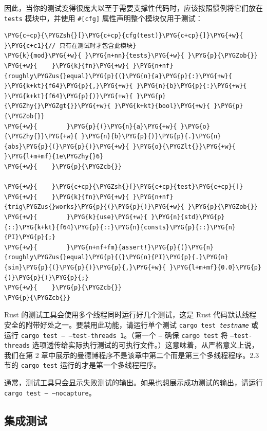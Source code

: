 因此，当你的测试变得很庞大以至于需要支撑性代码时，应该按照惯例将它们放在 \texttt{tests} 模块中，并使用 \texttt{\#[cfg]} 属性声明整个模块仅用于测试：

\begin{Verbatim}[commandchars=\\\{\},breaklines=true,breakanywhere=true,fontsize=\codefont,xleftmargin=17bp]
\PYG{c+cp}{\PYGZsh{}[}\PYG{c+cp}{cfg(test)}\PYG{c+cp}{]}\PYG{+w}{   }\PYG{c+c1}{// 只有在测试时才包含此模块}
\PYG{k}{mod}\PYG{+w}{ }\PYG{n+nn}{tests}\PYG{+w}{ }\PYG{p}{\PYGZob{}}
\PYG{+w}{    }\PYG{k}{fn}\PYG{+w}{ }\PYG{n+nf}{roughly\PYGZus{}equal}\PYG{p}{(}\PYG{n}{a}\PYG{p}{:}\PYG{+w}{ }\PYG{k+kt}{f64}\PYG{p}{,}\PYG{+w}{ }\PYG{n}{b}\PYG{p}{:}\PYG{+w}{ }\PYG{k+kt}{f64}\PYG{p}{)}\PYG{+w}{ }\PYG{p}{\PYGZhy{}\PYGZgt{}}\PYG{+w}{ }\PYG{k+kt}{bool}\PYG{+w}{ }\PYG{p}{\PYGZob{}}
\PYG{+w}{        }\PYG{p}{(}\PYG{n}{a}\PYG{+w}{ }\PYG{o}{\PYGZhy{}}\PYG{+w}{ }\PYG{n}{b}\PYG{p}{)}\PYG{p}{.}\PYG{n}{abs}\PYG{p}{(}\PYG{p}{)}\PYG{+w}{ }\PYG{o}{\PYGZlt{}}\PYG{+w}{ }\PYG{l+m+mf}{1e\PYGZhy{}6}
\PYG{+w}{    }\PYG{p}{\PYGZcb{}}

\PYG{+w}{    }\PYG{c+cp}{\PYGZsh{}[}\PYG{c+cp}{test}\PYG{c+cp}{]}
\PYG{+w}{    }\PYG{k}{fn}\PYG{+w}{ }\PYG{n+nf}{trig\PYGZus{}works}\PYG{p}{(}\PYG{p}{)}\PYG{+w}{ }\PYG{p}{\PYGZob{}}
\PYG{+w}{        }\PYG{k}{use}\PYG{+w}{ }\PYG{n}{std}\PYG{p}{::}\PYG{k+kt}{f64}\PYG{p}{::}\PYG{n}{consts}\PYG{p}{::}\PYG{n}{PI}\PYG{p}{;}
\PYG{+w}{        }\PYG{n+nf+fm}{assert!}\PYG{p}{(}\PYG{n}{roughly\PYGZus{}equal}\PYG{p}{(}\PYG{n}{PI}\PYG{p}{.}\PYG{n}{sin}\PYG{p}{(}\PYG{p}{)}\PYG{p}{,}\PYG{+w}{ }\PYG{l+m+mf}{0.0}\PYG{p}{)}\PYG{p}{)}\PYG{p}{;}
\PYG{+w}{    }\PYG{p}{\PYGZcb{}}
\PYG{p}{\PYGZcb{}}
\end{Verbatim}

Rust 的测试工具会使用多个线程同时运行好几个测试，这是 Rust 代码默认线程安全的附带好处之一。要禁用此功能，请运行单个测试 \texttt{cargo test \emph{testname}} 或运行 \texttt{cargo test -- --test-threads 1}。（第一个 \texttt{--} 确保 \texttt{cargo test} 将 \texttt{--test-threads} 选项透传给实际执行测试的可执行文件。）这意味着，从严格意义上说，我们在第 2 章中展示的曼德博程序不是该章中第二个而是第三个多线程程序。2.3 节的 \texttt{cargo test} 运行的才是第一个多线程程序。

通常，测试工具只会显示失败测试的输出。如果也想展示成功测试的输出，请运行 \texttt{cargo test -- --nocapture}。

\subsection{集成测试}


